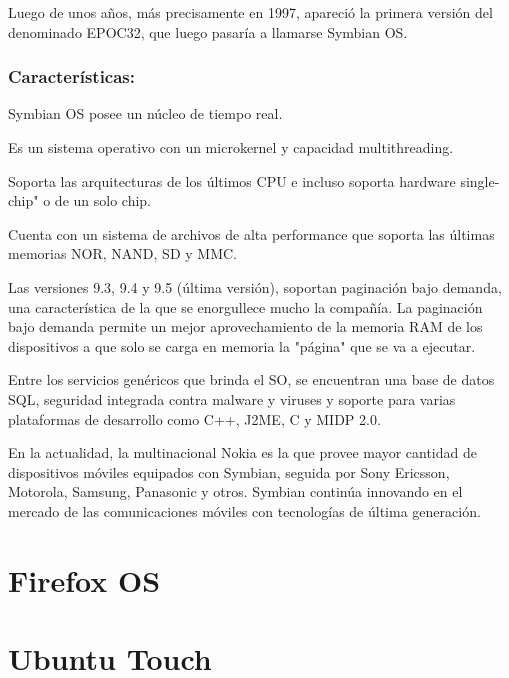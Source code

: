 Luego de unos años, más precisamente en 1997, apareció la primera versión del denominado EPOC32, que luego pasaría a llamarse Symbian OS.

\subsubsection*{Características:}
Symbian OS posee un núcleo de tiempo real. 

Es un sistema operativo con un microkernel y capacidad multithreading. 

Soporta las arquitecturas de los últimos CPU e incluso soporta hardware single-chip" o de un solo chip.

Cuenta con un sistema de archivos de alta performance que soporta las últimas memorias NOR, NAND, SD y MMC.

Las versiones 9.3, 9.4 y 9.5 (última versión), soportan paginación bajo demanda, una característica de la que se enorgullece mucho la compañía. La paginación bajo demanda permite un mejor aprovechamiento de la memoria RAM de los dispositivos a que solo se carga en memoria la "página" que se va a ejecutar.

Entre los servicios genéricos que brinda el SO, se encuentran una base de datos SQL, seguridad integrada contra malware y viruses y soporte para varias plataformas de desarrollo como C++, J2ME, C y MIDP 2.0.

En la actualidad, la multinacional Nokia es la que provee mayor cantidad de dispositivos móviles equipados con Symbian, seguida por Sony Ericsson, Motorola, Samsung, Panasonic y otros. Symbian continúa innovando en el mercado de las comunicaciones móviles con tecnologías de última generación.

\section*{Firefox OS}
\section*{Ubuntu Touch}








